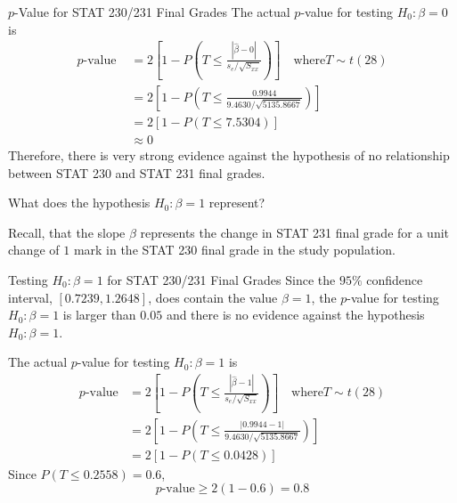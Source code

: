 \begin{Example}{$ p $-Value for STAT 230/231 Final Grades}{}
    The actual $ p $-value for testing $ H_0:\beta=0 $ is
    \[\begin{aligned}
            p\text{-value }
             & =2\left[1-P\left(T \leq \frac{|\hat{\beta}-0|}{s_{e} / \sqrt{S_{x x}}}\right)\right]
            \quad \text{where}T \sim t(28)                                                          \\
             & =2\left[1-P\left(T \leq \frac{0.9944}{9.4630 / \sqrt{5135.8667}}\right)\right]       \\
             & =2[1-P(T \leq 7.5304)]                                                               \\
             & \approx 0
        \end{aligned}\]
    Therefore, there is very strong evidence against the hypothesis of no relationship
    between STAT 230 and STAT 231 final grades.
\end{Example}


What does the hypothesis $ H_0:\beta=1 $ represent?

Recall, that the slope $ \beta $ represents the change in STAT 231 final grade
for a unit change of $ 1 $ mark in the STAT 230 final grade in the study population.

\begin{Example}{Testing $ H_0:\beta=1 $ for STAT 230/231 Final Grades}{}
    Since the $ 95\% $ confidence interval, $ \left[ 0.7239,1.2648 \right] $,
    does contain the value $ \beta=1 $, the $ p $-value for testing
    $ H_0:\beta=1 $ is larger than $ 0.05 $ and there is no evidence against the hypothesis
    $ H_0:\beta=1 $.

    The actual $ p $-value for testing $ H_0:\beta=1 $ is
    \[
        \begin{aligned}
            p\text{-value}
             & =2\left[1-P\left(T \leq \frac{|\hat{\beta}-1|}{s_{e} / \sqrt{S_{x x}}}\right)\right]
            \quad \text{where} T \sim t(28)                                                         \\
             & =2\left[1-P\left(T \leq \frac{|0.9944-1|}{9.4630 / \sqrt{5135.8667}}\right)\right]   \\
             & =2[1-P(T \leq 0.0428)]
        \end{aligned}
    \]
    Since $ P(T\leqslant 0.2558)=0.6 $,
    \[ p\text{-value}\geqslant 2(1-0.6)=0.8 \]
\end{Example}


